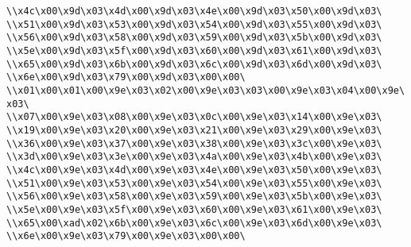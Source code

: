 \verb|\\x4c\x00\x9d\x03\x4d\x00\x9d\x03\x4e\x00\x9d\x03\x50\x00\x9d\x03\|\newline
\verb|\\x51\x00\x9d\x03\x53\x00\x9d\x03\x54\x00\x9d\x03\x55\x00\x9d\x03\|\newline
\verb|\\x56\x00\x9d\x03\x58\x00\x9d\x03\x59\x00\x9d\x03\x5b\x00\x9d\x03\|\newline
\verb|\\x5e\x00\x9d\x03\x5f\x00\x9d\x03\x60\x00\x9d\x03\x61\x00\x9d\x03\|\newline
\verb|\\x65\x00\x9d\x03\x6b\x00\x9d\x03\x6c\x00\x9d\x03\x6d\x00\x9d\x03\|\newline
\verb|\\x6e\x00\x9d\x03\x79\x00\x9d\x03\x00\x00\|\newline
\verb|\\x01\x00\x01\x00\x9e\x03\x02\x00\x9e\x03\x03\x00\x9e\x03\x04\x00\x9e\x03\|\newline
\verb|\\x07\x00\x9e\x03\x08\x00\x9e\x03\x0c\x00\x9e\x03\x14\x00\x9e\x03\|\newline
\verb|\\x19\x00\x9e\x03\x20\x00\x9e\x03\x21\x00\x9e\x03\x29\x00\x9e\x03\|\newline
\verb|\\x36\x00\x9e\x03\x37\x00\x9e\x03\x38\x00\x9e\x03\x3c\x00\x9e\x03\|\newline
\verb|\\x3d\x00\x9e\x03\x3e\x00\x9e\x03\x4a\x00\x9e\x03\x4b\x00\x9e\x03\|\newline
\verb|\\x4c\x00\x9e\x03\x4d\x00\x9e\x03\x4e\x00\x9e\x03\x50\x00\x9e\x03\|\newline
\verb|\\x51\x00\x9e\x03\x53\x00\x9e\x03\x54\x00\x9e\x03\x55\x00\x9e\x03\|\newline
\verb|\\x56\x00\x9e\x03\x58\x00\x9e\x03\x59\x00\x9e\x03\x5b\x00\x9e\x03\|\newline
\verb|\\x5e\x00\x9e\x03\x5f\x00\x9e\x03\x60\x00\x9e\x03\x61\x00\x9e\x03\|\newline
\verb|\\x65\x00\xad\x02\x6b\x00\x9e\x03\x6c\x00\x9e\x03\x6d\x00\x9e\x03\|\newline
\verb|\\x6e\x00\x9e\x03\x79\x00\x9e\x03\x00\x00\|\newline

